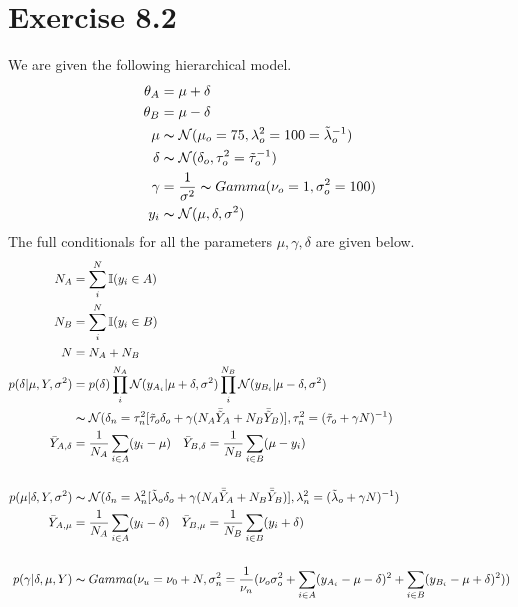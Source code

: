 \documentclass[11pt, letterpaper]{article}
\begin{document}
\section{Exercise 8.2}
We are given the following hierarchical model.
\begin{align*}
    \theta_A &= \mu + \delta \\
    \theta_B &= \mu - \delta \\
    \mu &\thicksim \mathcal{N}(\mu_o=75, \lambda_o^2=100=\tilde{\lambda}_o^{-1}) \\
    \delta &\thicksim \mathcal{N}(\delta_o, \tau_o^2=\tilde{\tau}_o^{-1}) \\
    \gamma &= \frac{1}{\sigma^2} \thicksim Gamma(\nu_o=1, \sigma_o^2=100) \\
    y_i &\thicksim \mathcal{N}(\mu, \delta, \sigma^2) \\
\end{align*}
The full conditionals for all the parameters $\mu, \gamma, \delta$ are given below.
\begin{align*}
    N_A &= \sum_i^N \mathbb{I}(y_i \in A) \\
    N_B &= \sum_i^N \mathbb{I}(y_i \in B) \\
    N &= N_A + N_B \\
    p(\delta|\mu, Y, \sigma^2)
        &= p(\delta) \prod_i^{N_A} \mathcal{N}(y_{A_i}|\mu+\delta, \sigma^2) \prod_i^{N_B} \mathcal{N}(y_{B_i}|\mu-\delta, \sigma^2) \\
        &\thicksim \mathcal{N} (
            \delta_n=\tau_n^2[\tilde{\tau}_o\delta_o + \gamma(N_A\bar{\tilde{Y}}_A + N_B\bar{\tilde{Y}}_B)],
            \tau_n^2=(\tilde{\tau}_o + \gamma N)^{-1}
        ) \\
    \bar{Y}_{A,\delta} &= \frac{1}{N_A} \sum_{i\in A} (y_i - \mu) \quad \bar{Y}_{B,\delta} = \frac{1}{N_B} \sum_{i\in B} (\mu - y_i) \\ \\
    p(\mu|\delta, Y, \sigma^2)
        &\thicksim \mathcal{N} (
            \delta_n=\lambda_n^2[\tilde{\lambda}_o\delta_o + \gamma(N_A\bar{\tilde{Y}}_A + N_B\bar{\tilde{Y}}_B)],
            \lambda_n^2=(\tilde{\lambda}_o + \gamma N)^{-1}
        ) \\
    \bar{Y}_{A,\mu} &= \frac{1}{N_A} \sum_{i\in A} (y_i - \delta) \quad \bar{Y}_{B,\mu} = \frac{1}{N_B} \sum_{i\in B} (y_i + \delta) \\ \\
    p(\gamma|\delta, \mu, Y)
        &\thicksim Gamma(
            \nu_u = \nu_0+N,
            \sigma_n^2 = \frac{1}{\nu_n} (
                \nu_o\sigma_o^2
                + \sum_{i\in A} (y_{A_i} - \mu - \delta)^2
                + \sum_{i\in B} (y_{B_i} - \mu + \delta)^2
            )
        ) \\
\end{align*}
\end{document}
